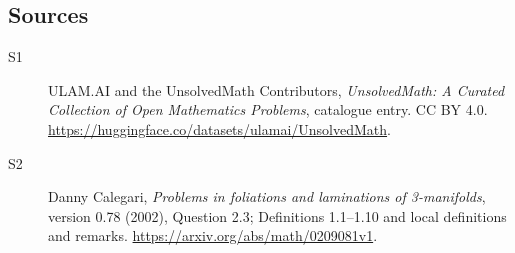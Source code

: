 \documentclass[11pt]{article}
\begin{document}
\subsection{Sources}
\begin{description}
\item[\hypertarget{source:statement:1}{S1}] ULAM.AI and the UnsolvedMath Contributors, \emph{UnsolvedMath: A Curated Collection of Open Mathematics Problems}, catalogue entry. CC BY 4.0. \url{https://huggingface.co/datasets/ulamai/UnsolvedMath}.
\item[\hypertarget{source:statement:2}{S2}] Danny Calegari, \emph{Problems in foliations and laminations of 3-manifolds}, version 0.78 (2002), Question 2.3; Definitions 1.1--1.10 and local definitions and remarks. \url{https://arxiv.org/abs/math/0209081v1}.
\end{description}
\label{end:statement}
\end{document}
